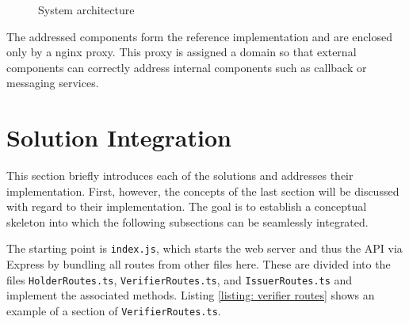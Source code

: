     \begin{figure}[ht]
        \centering
        \caption{System architecture}
        \label{figure: sys architecture}
    \end{figure}
    
    The addressed components form the reference implementation and are enclosed only by a nginx proxy. This proxy is assigned a domain so that external components can correctly address internal components such as callback or messaging services. 
    
    \section{Solution Integration}\label{section: integration}
    
    This section briefly introduces each of the solutions and addresses their implementation. First, however, the concepts of the last section will be discussed with regard to their implementation. The goal is to establish a conceptual skeleton into which the following subsections can be seamlessly integrated.
    
    The starting point is \texttt{index.js}, which starts the web server and thus the API via Express by bundling all routes from other files here. These are divided into the files \texttt{HolderRoutes.ts}, \texttt{VerifierRoutes.ts}, and \texttt{IssuerRoutes.ts} and implement the associated methods. Listing \ref{listing: verifier routes} shows an example of a section of \texttt{VerifierRoutes.ts}.
    \newline

